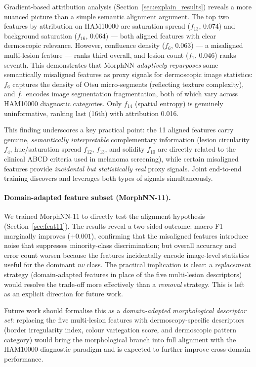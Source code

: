 \documentclass[preprint,12pt]{elsarticle}
\begin{document}
Gradient-based attribution analysis (Section~\ref{sec:explain_results})
reveals a more nuanced picture than a simple semantic alignment argument.
The top two features by attribution on HAM10000 are saturation spread
($f_{13}$, 0.074) and background saturation ($f_{16}$, 0.064) --- both
aligned features with clear dermoscopic relevance.  However, confluence
density ($f_6$, 0.063) --- a misaligned multi-lesion feature --- ranks
third overall, and lesion count ($f_1$, 0.046) ranks seventh.  This
demonstrates that MorphNN \emph{adaptively repurposes} some semantically
misaligned features as proxy signals for dermoscopic image statistics:
$f_6$ captures the density of Otsu micro-segments (reflecting texture
complexity), and $f_1$ encodes image segmentation fragmentation, both of
which vary across HAM10000 diagnostic categories.  Only $f_{14}$
(spatial entropy) is genuinely uninformative, ranking last (16th)
with attribution 0.016.

This finding underscores a key practical point: the 11 aligned features
carry genuine, \emph{semantically interpretable} complementary
information (lesion circularity $f_4$, hue/saturation spread $f_{12}$,
$f_{13}$, and solidity $f_{10}$ are directly related to the clinical
ABCD criteria used in melanoma screening), while certain misaligned
features provide \emph{incidental but statistically real} proxy signals.
Joint end-to-end training discovers and leverages both types of signals
simultaneously.

\paragraph{Domain-adapted feature subset (MorphNN-11).}
We trained MorphNN-11 to directly test the alignment hypothesis
(Section~\ref{sec:feat11}).  The results reveal a two-sided outcome:
macro F1 marginally improves ($+0.001$), confirming that the misaligned
features introduce noise that suppresses minority-class discrimination;
but overall accuracy and error count worsen because the features
incidentally encode image-level statistics useful for the dominant
\textit{nv} class.  The practical implication is clear: a
\emph{replacement} strategy (domain-adapted features in place of the
five multi-lesion descriptors) would resolve the trade-off more
effectively than a \emph{removal} strategy.  This is left as an
explicit direction for future work.

Future work should formalise this as a \emph{domain-adapted morphological
descriptor set}: replacing the five multi-lesion features with
dermoscopy-specific descriptors (border irregularity index, colour
variegation score, and dermoscopic pattern category) would bring the
morphological branch into full alignment with the HAM10000 diagnostic
paradigm and is expected to further improve cross-domain performance.
\end{document}
